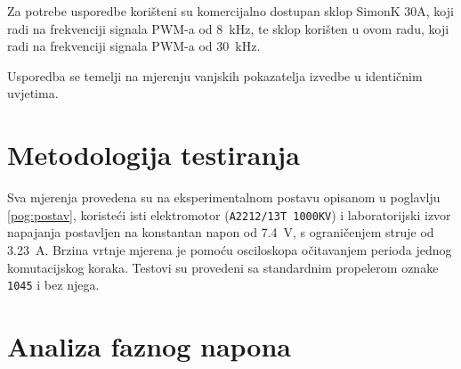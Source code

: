 \documentclass[diplomskirad, upload]{fer}
\begin{document}
Za potrebe usporedbe korišteni su komercijalno dostupan sklop SimonK 30A, koji
radi na frekvenciji signala PWM-a od \SI{8}{\kilo\hertz}, te sklop korišten u
ovom radu, koji radi na frekvenciji signala PWM-a od \SI{30}{\kilo\hertz}.

Usporedba se temelji na mjerenju vanjskih pokazatelja izvedbe u identičnim
uvjetima.

\section{Metodologija testiranja}
\label{sec:metodologija_testiranja}

Sva mjerenja provedena su na eksperimentalnom postavu opisanom u poglavlju
\ref{pog:postav}, koristeći isti elektromotor (\texttt{A2212/13T 1000KV}) i
laboratorijski izvor napajanja postavljen na konstantan napon od
\SI{7.4}{\volt}, s ograničenjem struje od \SI{3.23}{\ampere}. Brzina vrtnje
mjerena je pomoću osciloskopa očitavanjem perioda jednog komutacijskog koraka.
Testovi su provedeni sa standardnim propelerom oznake \texttt{1045} i bez
njega.

\section{Analiza faznog napona}
\label{sec:analiza_napona}
\end{document}
